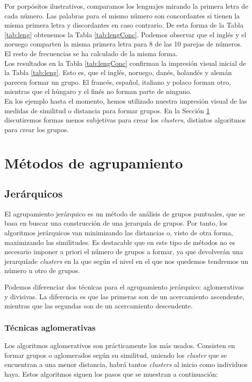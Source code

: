 \documentclass[a4paper, 20pt]{article}
\begin{document}
Por porpósitos ilustrativos, comparamos los lenguajes mirando la primera letra de cada número. Las palabras para el mismo número son concordantes si tienen la misma primera letra y discordantes en caso contrario. De esta forma de la Tabla \ref{tab:leng} obtenemos la Tabla \ref{tab:lengConc}. Podemos observar que el inglés y el noruego comparten la misma primera letra para 8 de las 10 parejas de números. El resto de frecuencias se ha calculado de la misma forma.\\
Los resultados en la Tabla \ref{tab:lengConc} confirman la impresión visual inicial de la Tabla \ref{tab:leng}. Esto es, que el inglés, noruego, danés, holandés y alemán parecen formar un grupo. El francés, español, italiano y polaco forman otro, mientras que el húngaro y el finés no forman parte de ninguno.\\

En los ejemplo hasta el momento, hemos utilizado nuestra impresión visual de las medidas de similitud o distancia para formar grupos. En la Sección \ref{sec:algoritmos} discutiremos formas menos subjetivas para crear los \textit{clusters}, distintos algoritmos para crear los grupos. 

\section{Métodos de agrupamiento}\label{sec:algoritmos}
\subsection{Jerárquicos}
El agrupamiento jerárquico es un método de análisis de grupos puntuales, que se basa en buscar una construcción de una jerarquía de grupos. Por tanto, los algoritmos jerárquicos van minimizando las distancias  o, visto de otra forma, maximizando  las similitudes. Es destacable que en este tipo de métodos no es necesario imponer a priori el número de grupos a formar, ya que devolverán una jerarquíade \textit{clusters} en la que según el nivel en el que nos quedemos tendremos un número u otro de grupos.

Podemos diferenciar dos técnicas para el agrupamiento jerárquico: aglomerativas y divisivas. La diferencia es que las primeras son de un acercamiento ascendente, mientras que las segundas son de un acercamiento descendente.

\subsubsection{Técnicas aglomerativas}
Los algoritmos aglomerativos son prácticamente los más usados. Consisten en formar grupos o aglomerados según su similitud, uniendo los \textit{cluster} que se encuentran a una menor distancia, habrá tantos \textit{clusters} al inicio como individuos haya. Estos algoritmos siguen los pasos que se muestran a continuación:
\end{document}
